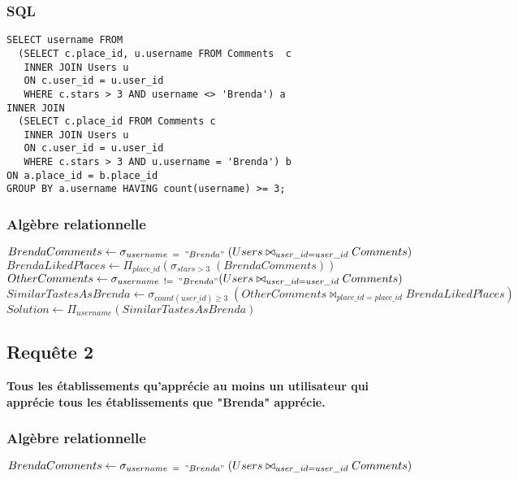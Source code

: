 \documentclass[a4paper,10pt]{article}
\begin{document}
\subsubsection{SQL}

\begin{verbatim}
SELECT username FROM 
  (SELECT c.place_id, u.username FROM Comments  c 
   INNER JOIN Users u 
   ON c.user_id = u.user_id 
   WHERE c.stars > 3 AND username <> 'Brenda') a
INNER JOIN
  (SELECT c.place_id FROM Comments c 
   INNER JOIN Users u 
   ON c.user_id = u.user_id 
   WHERE c.stars > 3 AND u.username = 'Brenda') b
ON a.place_id = b.place_id
GROUP BY a.username HAVING count(username) >= 3;
\end{verbatim}

\subsubsection{Algèbre relationnelle}

$BrendaComments \leftarrow \sigma_{username\;\;=\;\;"Brenda"}\;(Users \bowtie_{user\_id=user\_id} Comments )$\\

$BrendaLikedPlaces \leftarrow \Pi_{place\_id} (\sigma_{stars>3}\;(BrendaComments))$ \\

$OtherComments \leftarrow \sigma_{username\;\; != \;\;"Brenda"} (Users \bowtie_{user\_id=user\_id} Comments )$\\

$SimilarTastesAsBrenda \leftarrow \sigma_{count(user\_id)\geq3}\; (OtherComments\bowtie_{place\_id=place\_id}BrendaLikedPlaces) $\\

$Solution \leftarrow \Pi_{username} (SimilarTastesAsBrenda) $

\newpage

\subsection{Requête 2}

\textbf{Tous les établissements qu’apprécie au moins un utilisateur qui apprécie tous les établissements que "Brenda" apprécie.}

\subsubsection{Algèbre relationnelle}

$BrendaComments \leftarrow \sigma_{username\;\;=\;\;"Brenda"}\;(Users \bowtie_{user\_id=user\_id} Comments )$\\
\end{document}
